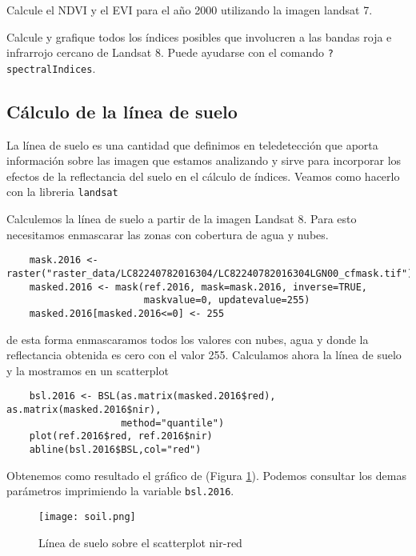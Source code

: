 \begin{act}
    Calcule el NDVI y el EVI para el año 2000 utilizando la imagen landsat 7.
\end{act}

\begin{act}
    Calcule y grafique todos los \'indices posibles que involucren a las bandas
    roja e infrarrojo cercano de Landsat 8. Puede ayudarse con el comando
    \texttt{?spectralIndices}.
\end{act}

\subsection{C\'alculo de la l\'inea de suelo}

La l\'inea de suelo es una cantidad que definimos en teledetecci\'on que aporta
informaci\'on sobre las imagen que estamos analizando y sirve para incorporar
los efectos de la reflectancia del suelo en el c\'alculo de \'indices.
Veamos como hacerlo con la libreria \texttt{landsat}

\begin{exa}
    Calculemos la l\'inea de suelo a partir de la imagen Landsat 8.
    Para esto necesitamos enmascarar las zonas con
    cobertura de agua y nubes.
    \begin{lstlisting}
    mask.2016 <- raster("raster_data/LC82240782016304/LC82240782016304LGN00_cfmask.tif")
    masked.2016 <- mask(ref.2016, mask=mask.2016, inverse=TRUE,
                        maskvalue=0, updatevalue=255)
    masked.2016[masked.2016<=0] <- 255
    \end{lstlisting}
    de esta forma enmascaramos todos los valores con nubes, agua y donde la
    reflectancia obtenida es cero con el valor 255.
    Calculamos ahora la l\'inea de suelo y la mostramos en un scatterplot
    \begin{lstlisting}
    bsl.2016 <- BSL(as.matrix(masked.2016$red), as.matrix(masked.2016$nir),
                    method="quantile")
    plot(ref.2016$red, ref.2016$nir)
    abline(bsl.2016$BSL,col="red")
    \end{lstlisting}
    Obtenemos como resultado el gr\'afico de (Figura \ref{fig:soil}). Podemos consultar
    los demas par\'ametros imprimiendo la variable \texttt{bsl.2016}.
    \begin{figure}[h!]
    \begin{center}
        \texttt{[image: soil.png]}
    \end{center}
    \caption{L\'inea de suelo sobre el scatterplot nir-red}
    \label{fig:soil}
    \end{figure}

\end{exa}

